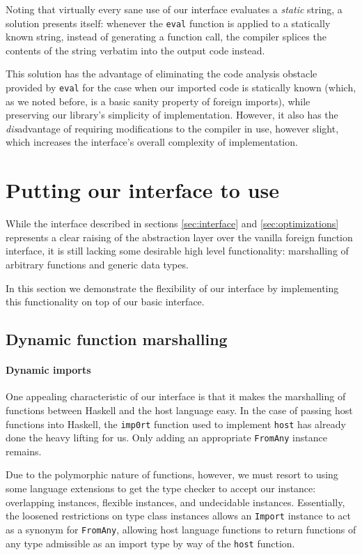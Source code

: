\documentclass[preprint]{sigplanconf}
\begin{document}
Noting that virtually every sane use of our interface evaluates a \emph{static}
string, a solution presents itself: whenever the \lstinline!eval! function
is applied to a statically known string, instead of generating a function call,
the compiler splices the contents of the string verbatim into the output code
instead.

This solution has the advantage of eliminating the code analysis obstacle
provided by \lstinline!eval! for the case when our imported code is statically
known (which, as we noted before, is a basic sanity property of foreign
imports), while preserving our library's simplicity of implementation.
However, it also has the \emph{dis}advantage of requiring modifications to the
compiler in use, however slight, which increases the interface's overall
complexity of implementation.

\section{Putting our interface to use}
\label{sec:extensions}
While the interface described in sections \ref{sec:interface} and
\ref{sec:optimizations} represents a clear raising of the abstraction layer
over the vanilla foreign function interface, it is still lacking some
desirable high level functionality: marshalling of arbitrary functions and
generic data types.

In this section we demonstrate the flexibility of our interface by implementing
this functionality on top of our basic interface.

\subsection{Dynamic function marshalling}
\label{sec:marshalling-functions}
\paragraph{Dynamic imports}
One appealing characteristic of our interface is that it makes the marshalling
of functions between Haskell and the host language easy. In the case of
passing host functions into Haskell, the \lstinline!imp0rt! function used to
implement \lstinline!host! has already done the heavy lifting for us.
Only adding an appropriate \lstinline!FromAny! instance remains.

Due to the polymorphic nature of functions, however, we must resort to using
some language extensions to get the type checker to accept our instance:
overlapping instances, flexible instances, and undecidable instances.
Essentially, the loosened restrictions on type class instances allows an
\lstinline!Import! instance to act as a synonym for \lstinline!FromAny!,
allowing host language functions to return functions of any type admissible
as an import type by way of the \lstinline!host! function.
\end{document}
